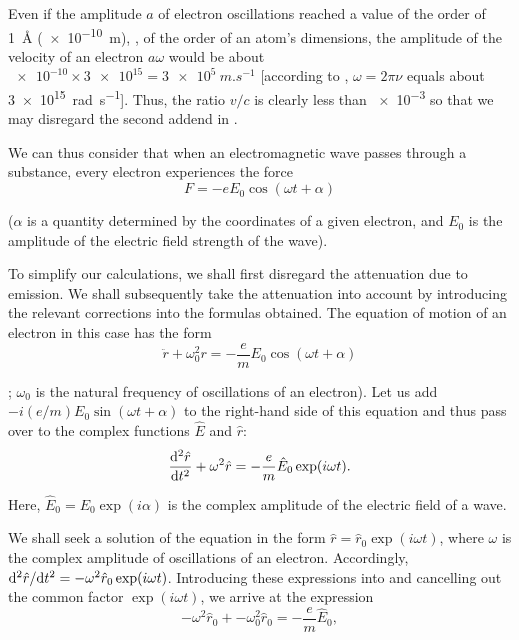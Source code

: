 \noindent
Even if the amplitude $a$ of electron oscillations reached a value of the order of \SI{1}{\angstrom} (\SI{e-10}{\metre}), \ie, of the order of an atom's dimensions, the amplitude of the velocity of an electron $a\omega$ would be about $\num{e-10}\times\num{3e15}=\SI{3e5}{m.s^{-1}}$ [according to , $\omega = 2\pi \nu$ equals about \SI{3e15}{rad.s^{-1}}].
Thus, the ratio $v/c$ is clearly less than \num{e-3} so that we may disregard the second addend in .

We can thus consider that when an electromagnetic wave passes through a substance, every electron experiences the force
\begin{equation*}
	F = -e E_0 \cos(\omega t + \alpha)
\end{equation*}

\noindent
($\alpha$ is a quantity determined by the coordinates of a given electron, and $E_0$ is the amplitude of the electric field strength of the wave).

To simplify our calculations, we shall first disregard the attenuation due to emission.
We shall subsequently take the attenuation into account by introducing the relevant corrections into the formulas obtained.
The equation of motion of an electron in this case has the form
\begin{equation*}
	\ddot{r} + \omega_0^2 r = -\frac{e}{m} E_0 \cos(\omega t + \alpha)
\end{equation*}

; $\omega_0$ is the natural frequency of oscillations of an electron).
Let us add $-i(e/m)E_0\sin(\omega t+\alpha)$ to the right-hand side of this equation and thus pass over to the complex functions $\hat{E}$ and $\hat{r}$:
\begin{equation}\label{eq:20_19}
	\dfrac{\mathrm{d}^2\hat{r}}{\mathrm{d} t^2} + \omega^2 \hat{r} = -\frac{e}{m} \hat{E}_0 \exp(i\omega t).
\end{equation}

Here, $\hat{E}_0=E_0\exp(i\alpha)$ is the complex amplitude of the electric field of a wave.

We shall seek a solution of the equation in the form $\hat{r}=\hat{r}_0\exp(i\omega t)$, where $\omega$ is the complex amplitude of oscillations of an electron.
Accordingly, $\mathrm{d}^2\hat{r}/\mathrm{d} t^2=-\omega^2 \hat{r}_0\exp(i\omega t)$.
Introducing these expressions into  and cancelling out the common factor $\exp(i\omega t)$, we arrive at the expression
\begin{equation*}
	-\omega^2 \hat{r}_0 + -\omega_0^2 \hat{r}_0 = -\frac{e}{m} \hat{E}_0,
\end{equation*}

